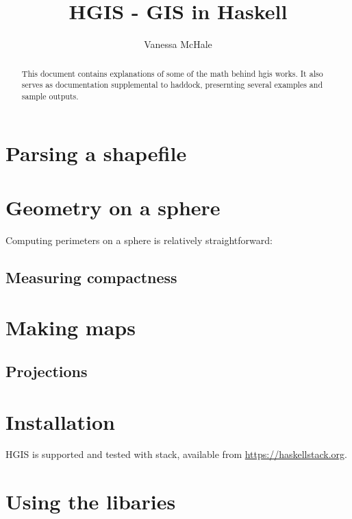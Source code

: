 \documentclass{article}
\begin{document}
\title{HGIS - GIS in Haskell}
\author{Vanessa McHale}

\maketitle

\begin{abstract}
This document contains explanations of some of the math behind hgis works. It
also serves as documentation supplemental to haddock, presernting several
examples and sample outputs. 
\end{abstract}

\tableofcontents

\section{Parsing a shapefile}

\section{Geometry on a sphere}

Computing perimeters on a sphere is relatively straightforward: 

\subsection{Measuring compactness}

\section{Making maps}

\subsection{Projections}

\begin{appendices}
  \section{Installation}
  HGIS is supported and tested with stack, available from
  \url{https://haskellstack.org}. 

  \section{Using the libaries}
\end{appendices}
\end{document}
